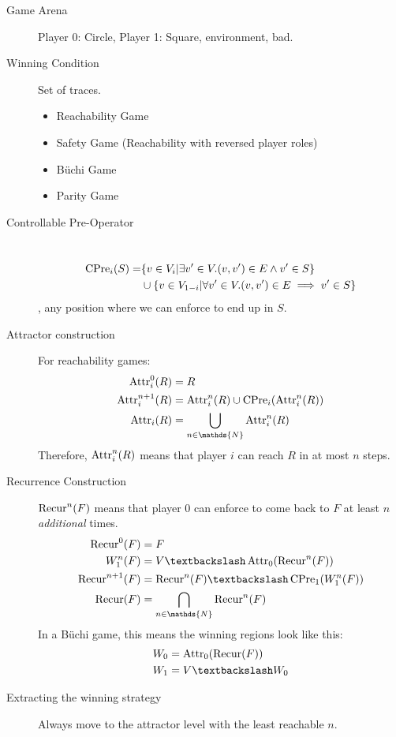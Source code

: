 \begin{description}
	\item[Game Arena] Player 0: Circle, Player 1: Square, environment, bad.
	\item[Winning Condition] Set of traces.
	\begin{itemize}
		\item Reachability Game
		\item Safety Game (Reachability with reversed player roles)
		\item Büchi Game
		\item Parity Game
	\end{itemize}
	\item[Controllable Pre-Operator] \ 
	\begin{align*} 
	\operatorname{CPre}_i(S) = &\{ v \in V_i | \exists v' \in V. (v,v') \in E \land v' \in S \} \\
	&\cup \{ v \in V_{1-i} | \forall v' \in V. (v, v') \in E \implies v' \in S \}
	\end{align*}
	\ie, any position where we can enforce to end up in $S$.
	\item[Attractor construction] For reachability games:
	\begin{align*}
		\ATTR^0_i(R) &= R \\
		\ATTR^{n+1}_i(R) &= \ATTR_i^n(R) \cup \CPRE_i(\ATTR_i^n(R))\\
		\ATTR_i(R) &= \bigcup_{n \in \mathds{N}} \ATTR_i^n(R)
	\end{align*}
	Therefore, $\operatorname{Attr}_i^n(R)$ means that player $i$ can reach $R$ in at most $n$ steps.
	\item[Recurrence Construction] $\operatorname{Recur}^n(F)$ means that player 0 can enforce to come back to $F$ at least $n$ \emph{additional} times.
	\begin{align*}
		\RECUR^0(F) &= F\\
		W_1^n(F) &= V\BS \ATTR_0(\RECUR^n(F))\\
		\RECUR^{n+1}(F) &= \RECUR^n(F)\BS \CPRE_1(W_1^n(F))\\
		\RECUR(F) &= \bigcap_{n \in \mathds{N}} \RECUR^n(F)
	\end{align*}
    In a Büchi game, this means the winning regions look like this:
	\begin{align*}
		W_0 &= \ATTR_0(\RECUR(F))\\
		W_1 &= V\BS W_0\\
	\end{align*}
	\item[Extracting the winning strategy] Always move to the attractor level with the least reachable $n$.

\end{description}
